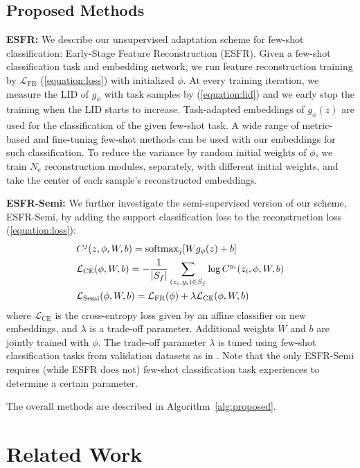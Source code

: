\documentclass{article}
\begin{document}
\subsection{Proposed Methods}
\label{subsection:proposed}
\textbf{ESFR:}
We describe our unsupervised adaptation scheme for few-shot classification: Early-Stage Feature Reconstruction (ESFR).
Given a few-shot classification task and embedding network, we run feature reconstruction training by $\mathcal{L}_\text{FR}$ (\ref{equation:loss}) with initialized $\phi$.
At every training iteration, we measure the LID of $g_\phi$ with task samples by (\ref{equation:lid}) and we early stop the training when the LID starts to increase.
Task-adapted embeddings of $g_\phi(z)$ are used for the classification of the given few-shot task.
A wide range of metric-based and fine-tuning few-shot methods can be used with our embeddings for such classification.
To reduce the variance by random initial weights of $\phi$, we train $N_e$ reconstruction modules, separately, with different initial weights, and take the center of each sample's reconstructed embeddings.

\textbf{ESFR-Semi:}
We further investigate the semi-supervised version of our scheme, ESFR-Semi, by adding the support classification loss to the reconstruction loss (\ref{equation:loss}):
\begin{align}
\label{equation:semi}
&C^j(z,\phi,W,b) = \text{softmax}_j [Wg_\phi(z)+b] \notag \\
&\mathcal{L}_{\text{CE}}(\phi, W, b) = - \frac{1}{|S_f|}\sum_{(z_i,y_i)\in S_f} \log C^{y_i}(z_i, \phi, W, b) \notag \\
&\mathcal{L}_{\text{Semi}}(\phi, W, b) = \mathcal{L}_{\text{FR}}(\phi) + \lambda \mathcal{L}_{\text{CE}}(\phi, W, b)
\end{align}
where $\mathcal{L}_{\text{CE}}$ is the cross-entropy loss given by an affine classifier on new embeddings, and $\lambda$ is a trade-off parameter.
Additional weights $W$ and $b$ are jointly trained with $\phi$.
The trade-off parameter $\lambda$ is tuned using few-shot classification tasks from validation datasets as in \citet{LaplacianShot}.
Note that the only ESFR-Semi requires (while ESFR does not) few-shot classification task experiences to determine a certain parameter.


The overall methods are described in Algorithm~\ref{alg:proposed}.  \section{Related Work}
\end{document}
